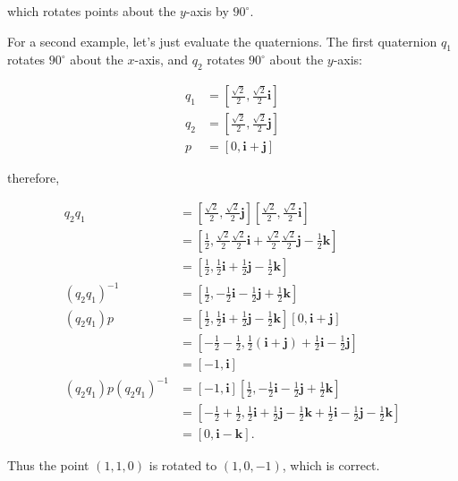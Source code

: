 which rotates points about the $y$-axis by $90^{\circ}$.

For a second example, let's just evaluate the quaternions. The first quaternion $q_{1}$ rotates $90^{\circ}$ about the $x$-axis, and $q_{2}$ rotates $90^{\circ}$ about the $y$-axis:

$$
\begin{aligned}
q_{1} & =\left[\frac{\sqrt{2}}{2}, \frac{\sqrt{2}}{2} \mathbf{i}\right] \\
q_{2} & =\left[\frac{\sqrt{2}}{2}, \frac{\sqrt{2}}{2} \mathbf{j}\right] \\
p & =[0, \mathbf{i}+\mathbf{j}]
\end{aligned}
$$

therefore,

$$
\begin{aligned}
q_{2} q_{1} & =\left[\frac{\sqrt{2}}{2}, \frac{\sqrt{2}}{2} \mathbf{j}\right]\left[\frac{\sqrt{2}}{2}, \frac{\sqrt{2}}{2} \mathbf{i}\right] \\
& =\left[\frac{1}{2}, \frac{\sqrt{2}}{2} \frac{\sqrt{2}}{2} \mathbf{i}+\frac{\sqrt{2}}{2} \frac{\sqrt{2}}{2} \mathbf{j}-\frac{1}{2} \mathbf{k}\right] \\
& =\left[\frac{1}{2}, \frac{1}{2} \mathbf{i}+\frac{1}{2} \mathbf{j}-\frac{1}{2} \mathbf{k}\right] \\
\left(q_{2} q_{1}\right)^{-1} & =\left[\frac{1}{2},-\frac{1}{2} \mathbf{i}-\frac{1}{2} \mathbf{j}+\frac{1}{2} \mathbf{k}\right] \\
\left(q_{2} q_{1}\right) p & =\left[\frac{1}{2}, \frac{1}{2} \mathbf{i}+\frac{1}{2} \mathbf{j}-\frac{1}{2} \mathbf{k}\right][0, \mathbf{i}+\mathbf{j}] \\
& =\left[-\frac{1}{2}-\frac{1}{2}, \frac{1}{2}(\mathbf{i}+\mathbf{j})+\frac{1}{2} \mathbf{i}-\frac{1}{2} \mathbf{j}\right] \\
& =[-1, \mathbf{i}] \\
\left(q_{2} q_{1}\right) p\left(q_{2} q_{1}\right)^{-1} & =[-1, \mathbf{i}]\left[\frac{1}{2},-\frac{1}{2} \mathbf{i}-\frac{1}{2} \mathbf{j}+\frac{1}{2} \mathbf{k}\right] \\
& =\left[-\frac{1}{2}+\frac{1}{2}, \frac{1}{2} \mathbf{i}+\frac{1}{2} \mathbf{j}-\frac{1}{2} \mathbf{k}+\frac{1}{2} \mathbf{i}-\frac{1}{2} \mathbf{j}-\frac{1}{2} \mathbf{k}\right] \\
& =[0, \mathbf{i}-\mathbf{k}] .
\end{aligned}
$$

Thus the point $(1,1,0)$ is rotated to $(1,0,-1)$, which is correct.

